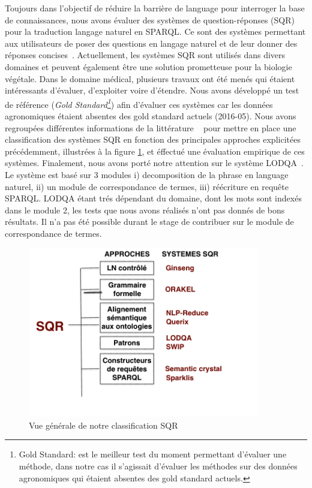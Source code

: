 Toujours dans l'objectif de réduire la barrière de language pour interroger la base de connaissances, nous avons évaluer des systèmes de question-réponses (SQR) pour la traduction langage naturel en SPARQL. Ce sont des systèmes permettant aux utilisateurs de poser des questions en langage naturel et de leur donner des réponses concises~\cite{HirschmanGaizauskas2001,Lopez-al2011}. Actuellement, les systèmes SQR sont utilisés dans divers domaines et peuvent également être une solution prometteuse pour la biologie végétale. Dans le domaine médical, plusieurs travaux ont été menés qui étaient intéressants d’évaluer, d'exploiter voire d’étendre. Nous avons développé un test de référence (\textit{Gold Standard\footnote{Gold Standard: est le meilleur test du moment permettant d'évaluer une méthode, dans notre cas il s'agissait d'évaluer les méthodes sur des données agronomiques qui étaient absentes des gold standard actuels.}}) afin d'évaluer ces systèmes car les données agronomiques étaient absentes des gold standard actuels (2016-05). Nous avons regroupées différentes informations de la littérature ~\cite{HirschmanGaizauskas2001,Lopez-al2011,Moldovan-al2002,NevesLeser2015} pour mettre en place une classification des systèmes SQR en fonction des principales approches explicitées précédemment, illustrées à la figure \ref{SQR}, et éffectué une évaluation empirique de ces systèmes. Finalement, nous avons porté notre attention sur le système LODQA~\cite{KimCohen2013}. Le système est basé sur 3 modules i) decomposition de la phrase en language naturel, ii) un module de correspondance de termes, iii) réécriture en requête SPARQL. LODQA étant trés dépendant du domaine, dont les mots sont indexés dans le module 2, les tests que nous avons réalisés n'ont pas donnés de bons résultats. Il n'a pas été possible durant le stage de contribuer sur le module de correspondance de termes.

\begin{figure}[!ht]
\begin{center}
	\includegraphics[width=0.90\textwidth]{Figures/classificationSQR.png}
\end{center}
\caption{\label{SQR} Vue générale de notre classification SQR}
\end{figure}

